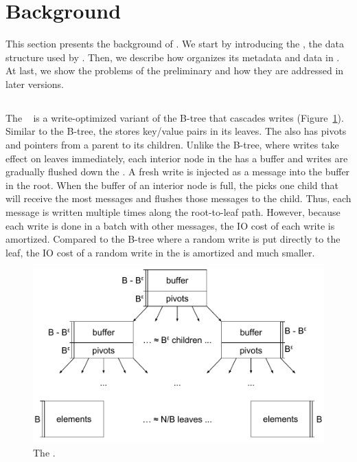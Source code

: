 \section{Background}
\label{sec:bg}

This section presents the background of \betrfs.
We start by introducing the \bet, the data structure used by \betrfs.
Then, we describe how \betrfs organizes its metadata and data in \bets.
At last, we show the problems of the preliminary \betrfs and how they are
addressed in later versions.

\subsection{\bet}
\label{subsec:bet}
The \bet~\cite{bet, betlogin} is a write-optimized variant of the B-tree that
cascades writes (Figure~\ref{fig:bet}).
Similar to the B-tree, the \bet stores key/value pairs in its leaves.
The \bet also has pivots and pointers from a parent to its children.
Unlike the B-tree, where writes take effect on leaves immediately, each interior
node in the \bet has a buffer and writes are gradually flushed down the \bet.
A fresh write is injected as a message into the buffer in the \bet root.
When the buffer of an interior node is full, the \bet picks one child that
will receive the most messages and flushes those messages to the child.
Thus, each message is written multiple times along the root-to-leaf path.
However, because each write is done in a batch with other messages,
the IO cost of each write is amortized.
Compared to the B-tree where a random write is put directly to the leaf, the IO
cost of a random write in the \bet is amortized and much smaller.

\begin{figure}
  \centering
  \includegraphics[width=.8\textwidth]{fig/bet}
  \caption{\label{fig:bet} The \bet.}
\end{figure}

